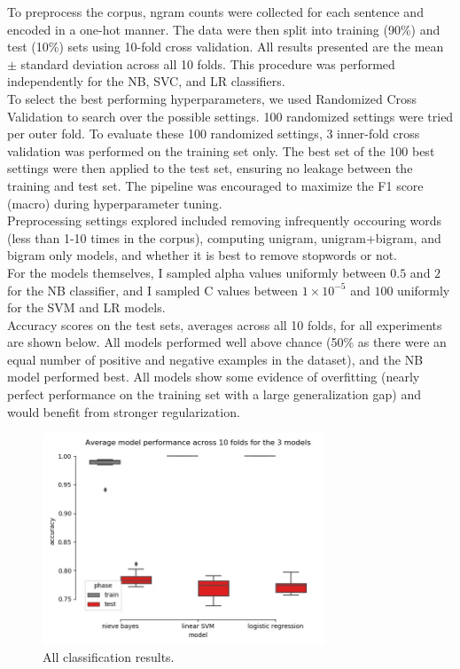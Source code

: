 \documentclass{amsart}
\theoremstyle{definition}
\theoremstyle{remark}
\numberwithin{equation}{section}
\begin{document}
To preprocess the corpus, ngram counts were collected for each sentence and
encoded in a one-hot manner. The data were then split into training (90\%) and
test (10\%) sets using 10-fold cross validation. All results presented are the
mean $\pm$ standard deviation across all 10 folds. This procedure was performed
independently for the NB, SVC, and LR classifiers. \\

To select the best performing hyperparameters, we used Randomized Cross
Validation to search over the possible settings. 100 randomized settings were
tried per outer fold. To evaluate these 100 randomized settings, 3 inner-fold
cross validation was performed on the training set only. The best set of the 100
best settings were then applied to the test set, ensuring no leakage between
the training and test set. The pipeline was encouraged to maximize the F1
score (macro) during hyperparameter tuning. \\

Preprocessing settings explored included removing infrequently occouring words
(less than 1-10 times in the corpus), computing unigram, unigram+bigram, and
bigram only models, and whether it is best to remove stopwords or not. \\

For the models themselves, I sampled alpha values uniformly between $0.5$ and $2$
for the NB classifier, and I sampled C values between $1\times10^{-5}$ and $100$
uniformly for the SVM and LR models. \\

Accuracy scores on the test sets, averages across all 10 folds, for all
experiments are shown below. All models performed well above chance (50\% as
there were an equal number of positive and negative examples in the dataset),
and the NB model performed best. All models show some evidence of overfitting
(nearly perfect performance on the training set with a large generalization gap)
and would benefit from stronger regularization. \\

\begin{figure}
  \caption{All classification results.}
  \centering
    \includegraphics[width=0.75\textwidth]{accs}
\end{figure}
\end{document}
